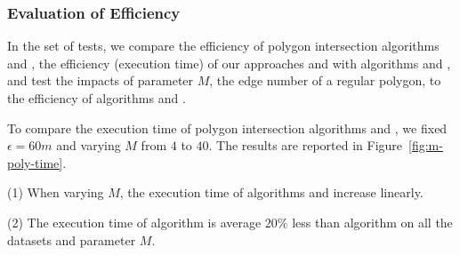 \subsubsection{Evaluation of Efficiency}


In the set of tests, we compare the efficiency of polygon intersection algorithms \rpia and \cpia, the efficiency (execution time) of our approaches \cist and \cista with algorithms \dpa and \squishe, and test the impacts of parameter $M$, \ie the edge number of a regular polygon, to the efficiency of algorithms \cist and \cista.
%



To compare the execution time of polygon intersection algorithms \rpia and \cpia, we fixed $\epsilon =60m$ and varying $M$ from $4$ to $40$.
%
The results are reported in Figure~\ref{fig:m-poly-time}.


\ni(1) When varying $M$, the execution time of algorithms \rpia and \cpia increase linearly.

\ni(2) The execution time of algorithm \rpia is average \textcolor[rgb]{1.00,0.00,0.00}{$20\%$ }less than algorithm \cpia on all the datasets and parameter $M$.




